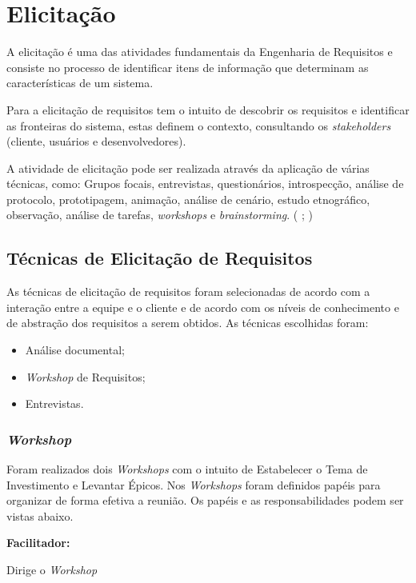 \chapter[Elicitação]{Elicitação}
A elicitação é uma das atividades fundamentais da Engenharia de Requisitos e consiste no processo de identificar
itens de informação que determinam as características de um sistema. \cite{jitnah} 

Para  a elicitação de requisitos tem o intuito de descobrir
os requisitos e identificar as fronteiras do sistema, estas definem o contexto, consultando os \textit{stakeholders} (cliente, usuários e desenvolvedores).

A atividade de elicitação pode ser realizada através da aplicação de várias técnicas, como: Grupos focais, entrevistas, questionários,
introspecção, análise de protocolo, prototipagem, animação, análise de cenário, estudo etnográfico, observação, análise de tarefas,
\textit{workshops} e \textit{brainstorming}. (\cite{jitnah} ; \cite{coulin})

\section{Técnicas de Elicitação de Requisitos}
\label{tecnicas}

As técnicas de elicitação de requisitos foram selecionadas de acordo com a interação entre a equipe e o cliente e de acordo com os níveis de conhecimento e de abstração dos requisitos a serem obtidos.
As técnicas escolhidas foram:\\
\begin{itemize}
\item Análise documental;
\item \textit{Workshop} de Requisitos;
\item Entrevistas.
\end{itemize}

\subsection{\textit{Workshop}}
  Foram realizados dois \textit{Workshops} com o intuito de Estabelecer o Tema de Investimento e Levantar Épicos. Nos \textit{Workshops}
  foram definidos papéis para organizar de forma efetiva a reunião. Os papéis e as responsabilidades podem ser vistas abaixo.
  
\textbf{Facilitador:}

	Dirige o \textit{Workshop}
	
